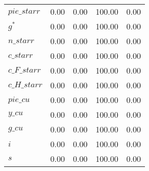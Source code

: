 \begin{center}
\begin{longtable}{lcccc}
$pie\_starr     $	 & 	                0.00	 & 	                0.00	 & 	              100.00	 & 	                0.00 \\ 
${g^*}          $	 & 	                0.00	 & 	                0.00	 & 	              100.00	 & 	                0.00 \\ 
$n\_starr       $	 & 	                0.00	 & 	                0.00	 & 	              100.00	 & 	                0.00 \\ 
$c\_starr       $	 & 	                0.00	 & 	                0.00	 & 	              100.00	 & 	                0.00 \\ 
$c\_F\_starr    $	 & 	                0.00	 & 	                0.00	 & 	              100.00	 & 	                0.00 \\ 
$c\_H\_starr    $	 & 	                0.00	 & 	                0.00	 & 	              100.00	 & 	                0.00 \\ 
$pie\_cu        $	 & 	                0.00	 & 	                0.00	 & 	              100.00	 & 	                0.00 \\ 
$y\_cu          $	 & 	                0.00	 & 	                0.00	 & 	              100.00	 & 	                0.00 \\ 
$g\_cu          $	 & 	                0.00	 & 	                0.00	 & 	              100.00	 & 	                0.00 \\ 
${i}            $	 & 	                0.00	 & 	                0.00	 & 	              100.00	 & 	                0.00 \\ 
${s}            $	 & 	                0.00	 & 	                0.00	 & 	              100.00	 & 	                0.00 \\ 
\end{longtable}
 \end{center}
